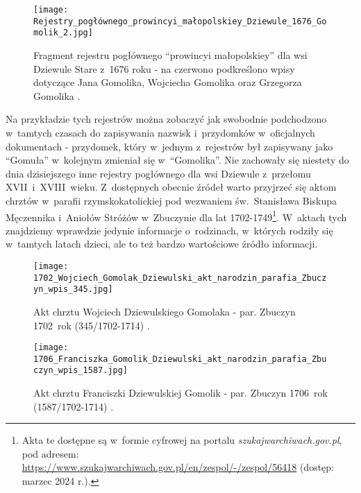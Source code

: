 \begin{figure}[!ht]
    \vspace*{0.5cm}
    \centering \texttt{[image: 
        Rejestry\_pogłównego\_prowincyi\_małopolskiey\_Dziewule\_1676\_Gomolik\_2.jpg]}
    \captionsetup{format=hang}
    \caption{Fragment rejestru pogłównego \enquote{prowincyi małopolskiey} 
    dla wsi Dziewule Stare z~1676 roku - na czerwono podkreślono wpisy 
    dotyczące Jana Gomolika, Wojciecha Gomolika oraz Grzegorza Gomolika 
    \cite{floyko}.}
    \label{fig:dziewule_1676}
\end{figure}

Na przykładzie tych rejestrów można zobaczyć jak swobodnie podchodzono 
w~tamtych czasach do zapisywania nazwisk i~przydomków w~oficjalnych 
dokumentach - przydomek, który w~jednym z~rejestrów był zapisywany jako 
\enquote{Gomuła} w~kolejnym zmieniał się w~\enquote{Gomolika}. Nie zachowały 
się niestety do dnia dzisiejszego inne rejestry pogłównego dla wsi Dziewule 
z~przełomu XVII~i~XVIII~wieku. Z~dostępnych obecnie źródeł warto przyjrzeć 
się aktom chrztów w~parafii rzymskokatolickiej pod wezwaniem św.~Stanisława 
Biskupa Męczennika i~Aniołów Stróżów w~Zbuczynie dla lat 
1702-1749\footnote{Akta te dostępne są w~formie cyfrowej na portalu 
\emph{szukajwarchiwach.gov.pl}, pod adresem: \\ 
\url{https://www.szukajwarchiwach.gov.pl/en/zespol/-/zespol/56418} (dostęp: 
marzec 2024 r.).}. W~aktach tych znajdziemy wprawdzie jedynie informacje 
o~rodzinach, w~których rodziły się w~tamtych latach dzieci, ale to też bardzo 
wartościowe źródło informacji.

\begin{figure}[!ht]
    \vspace*{0.5cm}
    \centering \texttt{[image: 
        1702\_Wojciech\_Gomolak\_Dziewulski\_akt\_narodzin\_parafia\_Zbuczyn\_wpis\_345.jpg]}
    \captionsetup{format=hang}
    \caption{Akt chrztu Wojciech Dziewulskiego Gomolaka - par. Zbuczyn 
    1702~rok (345/1702-1714) \cite{par_zbuczyn1}.}
    \label{fig:wgomola_1702}
\end{figure}

\begin{figure}[!ht]
    \vspace*{0.5cm}
    \centering \texttt{[image: 
        1706\_Franciszka\_Gomolik\_Dziewulski\_akt\_narodzin\_parafia\_Zbuczyn\_wpis\_1587.jpg]}
    \captionsetup{format=hang}
    \caption{Akt chrztu Franciszki Dziewulskiej Gomolik - par. Zbuczyn 
    1706~rok (1587/1702-1714) \cite{par_zbuczyn1}.}
    \label{fig:fgomola_1706}
\end{figure}

